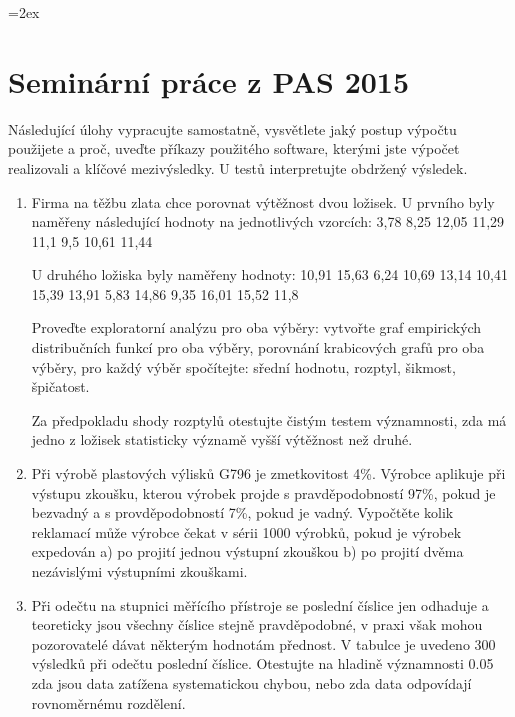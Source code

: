 \documentclass[a4paper,12pt]{article}
\begin{document}
\parskip=2ex
\parindent=0pt
\pagestyle{empty}
 \section*{Seminární práce z PAS 2015}

 Následující úlohy vypracujte samostatně, vysvětlete jaký postup výpočtu použijete a proč, 
 uveďte příkazy použitého software, kterými jste výpočet realizovali a klíčové mezivýsledky. 
 U testů interpretujte obdržený výsledek.


\begin{enumerate}
  \item 
Firma na těžbu zlata chce porovnat výtěžnost dvou ložisek. U prvního byly naměřeny následující hodnoty 
na jednotlivých vzorcích: 3,78 8,25 12,05 11,29 11,1 9,5 10,61 11,44

U druhého ložiska byly naměřeny hodnoty:
10,91 15,63 6,24 10,69 13,14 10,41 15,39 13,91 5,83 14,86
9,35 16,01 15,52 11,8

Proveďte exploratorní analýzu pro oba výběry: vytvořte graf empirických distribučních funkcí pro oba výběry, porovnání krabicových grafů pro oba výběry,
pro každý výběr spočítejte: sřední hodnotu, rozptyl, šikmost, špičatost.

Za předpokladu shody rozptylů otestujte čistým testem významnosti, zda má jedno z ložisek statisticky významě vyšší výtěžnost
než druhé. 
  \item Při výrobě plastových výlisků G796 je zmetkovitost 4\%. Výrobce aplikuje při výstupu zkoušku, kterou výrobek projde s pravděpodobností 97\%,
  pokud je bezvadný a s provděpodobností 7\%, pokud je vadný.
  Vypočtěte kolik reklamací může výrobce čekat v sérii 1000 výrobků, pokud je výrobek expedován 
  a) po projití jednou výstupní zkouškou b) po projití dvěma nezávislými výstupními zkouškami.


  \item  Při odečtu na stupnici měřícího přístroje se poslední číslice jen odhaduje a 
  teoreticky jsou všechny číslice stejně pravděpodobné, v praxi však mohou pozorovatelé 
  dávat některým hodnotám přednost. V tabulce je uvedeno 300 výsledků při odečtu poslední číslice. 
  Otestujte na hladině významnosti 0.05 zda jsou data zatížena systematickou chybou, nebo zda 
  data odpovídají rovnoměrnému rozdělení. 


\end{enumerate}
\end{document}
